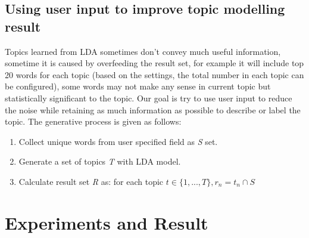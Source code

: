 \documentclass[11pt,twoside]{report}
\begin{document}
\section{Using user input to improve topic modelling result}

Topics learned from LDA sometimes don’t convey much useful information, sometime it is caused by overfeeding the result set, for example it will include top 20 words for each topic (based on the settings, the total number in each topic can be configured), some words may not make any sense in current topic but statistically significant to the topic. Our goal  is try to use user input to reduce the noise while retaining as much information as possible to describe or label the topic. The generative process is given as follows: 
\begin{enumerate}
\item Collect unique words from user specified field as \textit{S} set.
\item Generate a set of topics \textit{T} with LDA model.
\item Calculate result set \textit{R} as: for each topic $t\in\{1,...,T\}, r_n = t_n \cap S$
\end{enumerate}

\chapter{Experiments and Result}
\end{document}
